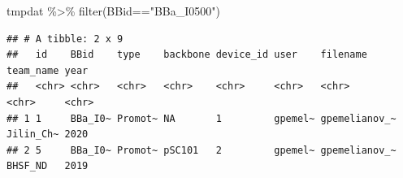 \documentclass[
]{article}
\newenvironment{Shaded}{\begin{snugshade}}{\end{snugshade}}
\newcommand{\FunctionTok}[1]{\textcolor[rgb]{0.00,0.00,0.00}{#1}}
\newcommand{\NormalTok}[1]{#1}
\newcommand{\SpecialCharTok}[1]{\textcolor[rgb]{0.00,0.00,0.00}{#1}}
\newcommand{\StringTok}[1]{\textcolor[rgb]{0.31,0.60,0.02}{#1}}
\begin{document}
\begin{Shaded}
\begin{Highlighting}[]
\NormalTok{tmpdat }\SpecialCharTok{\%\textgreater{}\%} 
  \FunctionTok{filter}\NormalTok{(BBid}\SpecialCharTok{==}\StringTok{"BBa\_I0500"}\NormalTok{)}
\end{Highlighting}
\end{Shaded}

\begin{verbatim}
## # A tibble: 2 x 9
##   id    BBid    type    backbone device_id user    filename      team_name year 
##   <chr> <chr>   <chr>   <chr>    <chr>     <chr>   <chr>         <chr>     <chr>
## 1 1     BBa_I0~ Promot~ NA       1         gpemel~ gpemelianov_~ Jilin_Ch~ 2020 
## 2 5     BBa_I0~ Promot~ pSC101   2         gpemel~ gpemelianov_~ BHSF_ND   2019
\end{verbatim}
\end{document}
